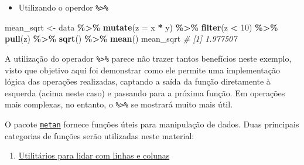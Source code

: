 \documentclass[
]{book}
\newenvironment{Shaded}{\begin{snugshade}}{\end{snugshade}}
\newcommand{\CommentTok}[1]{\textcolor[rgb]{0.56,0.35,0.01}{\textit{#1}}}
\newcommand{\DataTypeTok}[1]{\textcolor[rgb]{0.13,0.29,0.53}{#1}}
\newcommand{\DecValTok}[1]{\textcolor[rgb]{0.00,0.00,0.81}{#1}}
\newcommand{\KeywordTok}[1]{\textcolor[rgb]{0.13,0.29,0.53}{\textbf{#1}}}
\newcommand{\NormalTok}[1]{#1}
\newcommand{\OperatorTok}[1]{\textcolor[rgb]{0.81,0.36,0.00}{\textbf{#1}}}
\newcommand{\StringTok}[1]{\textcolor[rgb]{0.31,0.60,0.02}{#1}}
\providecommand{\tightlist}{%
  \setlength{\itemsep}{0pt}\setlength{\parskip}{0pt}}
\numberwithin{equation}{section}
\begin{document}
\begin{itemize}
\tightlist
\item
  Utilizando o operdor \texttt{\%\textgreater{}\%}
\end{itemize}

\begin{Shaded}
\begin{Highlighting}[]
\NormalTok{mean\_sqrt \textless{}{-}}\StringTok{ }
\StringTok{  }\NormalTok{data }\OperatorTok{\%\textgreater{}\%}\StringTok{ }
\StringTok{  }\KeywordTok{mutate}\NormalTok{(}\DataTypeTok{z =}\NormalTok{ x }\OperatorTok{*}\StringTok{ }\NormalTok{y) }\OperatorTok{\%\textgreater{}\%}
\StringTok{  }\KeywordTok{filter}\NormalTok{(z }\OperatorTok{\textless{}}\StringTok{ }\DecValTok{10}\NormalTok{) }\OperatorTok{\%\textgreater{}\%}
\StringTok{  }\KeywordTok{pull}\NormalTok{(z) }\OperatorTok{\%\textgreater{}\%}
\StringTok{  }\KeywordTok{sqrt}\NormalTok{() }\OperatorTok{\%\textgreater{}\%}
\StringTok{  }\KeywordTok{mean}\NormalTok{()}
\NormalTok{mean\_sqrt}
\CommentTok{\# [1] 1.977507}
\end{Highlighting}
\end{Shaded}

A utilização do operador \texttt{\%\textgreater{}\%} parece não trazer tantos benefícios neste exemplo, visto que objetivo aqui foi demonstrar como ele permite uma implementação lógica das operações realizadas, captando a saída da função diretamente à esquerda (acima neste caso) e passando para a próxima função. Em operações mais complexas, no entanto, o \texttt{\%\textgreater{}\%} se mostrará muito mais útil.

O pacote \href{https://tiagoolivoto.github.io/metan/}{\texttt{metan}} fornece funções úteis para manipulação de dados. Duas principais categorias de funções serão utilizadas neste material:

\begin{enumerate}
\def\labelenumi{\arabic{enumi}.}
\tightlist
\item
  \href{https://tiagoolivoto.github.io/metan/reference/utils_rows_cols.html}{Utilitários para lidar com linhas e colunas}
\end{enumerate}
\end{document}
